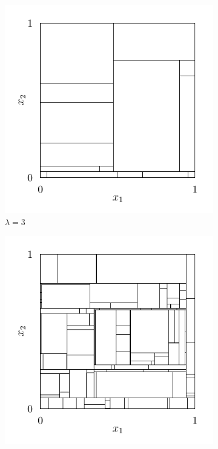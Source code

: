 \begin{figure}[ht]
  \centering
  \begin{subfigure}{0.32\textwidth}
    \centering
    \includegraphics[scale=0.64]{graphics/plot_mondrian_process_1.pdf}
    \caption{$\lambda = 3$}
  \end{subfigure}
  \begin{subfigure}{0.32\textwidth}
    \centering
    \includegraphics[scale=0.64]{graphics/plot_mondrian_process_2.pdf}

\end{subfigure}
\end{figure}
